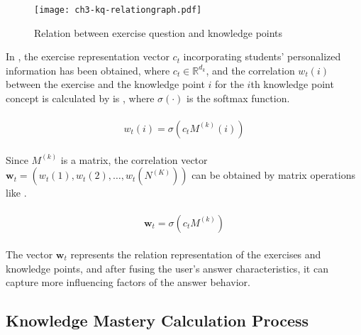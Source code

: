 \begin{figure}[htbp!]
    \centering
    \texttt{[image: ch3-kq-relationgraph.pdf]}
    \caption{Relation between exercise question and knowledge points}\label{fig:ch3-kq-relationgraph}
\end{figure}

In \eqname{\ref{fml:ch3-sbcap}}, the exercise representation vector \(c_t\) incorporating students' personalized information has been obtained, where \(c_t\in\mathbb{R}^{d_k}\), and the correlation \(w_t(i)\) between the exercise and the knowledge point \(i\) for the \(i\)th knowledge point concept is calculated by is \eqname{\ref{fml:ch3-corkq}}, where \(\sigma(\cdot)\) is the softmax function.

\begin{align}\label{fml:ch3-corkq}
    \begin{split}
        w_t(i)=\sigma(c_t M^{(k)}(i))
    \end{split}
\end{align}

Since \(M^{(k)}\) is a matrix, the correlation vector \(\mathbf{w}_t=(w_t(1),w_t(2),\ldots,w_t(N^{(K)}))\) can be obtained by matrix operations like \eqname{\ref{fml:ch3-corkq-mat}}.

\begin{align}\label{fml:ch3-corkq-mat}
    \begin{split}
        \mathbf{w}_t=\sigma(c_t M^{(k)})
    \end{split}
\end{align}

The vector \(\mathbf{w}_t\) represents the relation representation of the exercises and knowledge points, and after fusing the user's answer characteristics, it can capture more influencing factors of the answer behavior.

\subsection{Knowledge Mastery Calculation Process}


